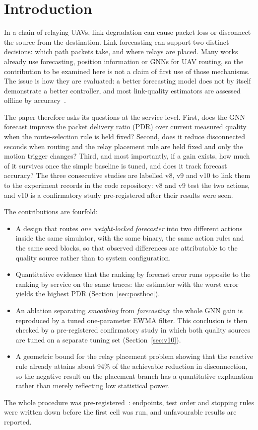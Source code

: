 \documentclass[11pt,a4paper]{article}
\begin{document}
\section{Introduction}
In a chain of relaying UAVs, link degradation can cause packet loss or
disconnect the source from the destination. Link forecasting can support two
distinct decisions: which path packets take, and where relays are placed. Many
works already use forecasting, position information or GNNs for UAV routing, so
the contribution to be examined here is not a claim of first use of those
mechanisms. The issue is how they are evaluated: a better forecasting model
does not by itself demonstrate a better controller, and most link-quality
estimators are assessed offline by accuracy~\cite{cerar}.

The paper therefore asks its questions at the service level. First, does the
GNN forecast improve the packet delivery ratio (PDR) over current measured
quality when the route-selection rule is held fixed? Second, does it reduce
disconnected seconds when routing and the relay placement rule are held fixed
and only the motion trigger changes? Third, and most importantly, if a gain
exists, how much of it survives once the simple baseline is tuned, and does it
track forecast accuracy? The three consecutive studies are labelled v8, v9 and
v10 to link them to the experiment records in the code repository: v8 and v9
test the two actions, and v10 is a confirmatory study pre-registered after their
results were seen.

The contributions are fourfold:
\begin{itemize}
\item A design that routes \emph{one weight-locked forecaster} into two
different actions inside the same simulator, with the same binary, the same
action rules and the same seed blocks, so that observed differences are
attributable to the quality source rather than to system configuration.
\item Quantitative evidence that the ranking by forecast error runs opposite to
the ranking by service on the same traces: the estimator with the worst error
yields the highest PDR (Section~\ref{sec:posthoc}).
\item An ablation separating \emph{smoothing} from \emph{forecasting}: the whole
GNN gain is reproduced by a tuned one-parameter EWMA filter. This conclusion is
then checked by a pre-registered confirmatory study in which both quality
sources are tuned on a separate tuning set (Section~\ref{sec:v10}).
\item A geometric bound for the relay placement problem showing that the
reactive rule already attains about 94\% of the achievable reduction in
disconnection, so the negative result on the placement branch has a
quantitative explanation rather than merely reflecting low statistical power.
\end{itemize}
The whole procedure was pre-registered~\cite{nosek}: endpoints, test order and
stopping rules were written down before the first cell was run, and unfavourable
results are reported.
\end{document}
